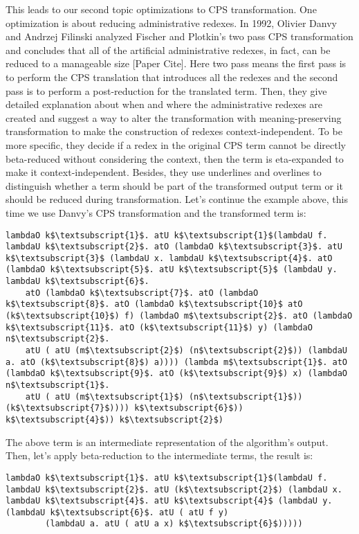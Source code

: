 This leads to our second topic optimizations to CPS transformation. One optimization is about reducing administrative redexes. In 1992, Olivier Danvy and Andrzej Filinski analyzed Fischer and Plotkin's two pass CPS transformation and concludes that all of the artificial administrative redexes, in fact, can be reduced to a manageable size [Paper Cite]. Here two pass means the first pass is to perform the CPS translation that introduces all the redexes and the second pass is to perform a post-reduction for the translated term. Then, they give detailed explanation about when and where the administrative redexes are created and suggest a way to alter the transformation with meaning-preserving transformation to make the construction of redexes context-independent. To be more specific, they decide if a redex in the original CPS term cannot be directly beta-reduced without considering the context, then the term is eta-expanded to make it context-independent. Besides, they use underlines and overlines to distinguish whether a term should be part of the transformed output term or it should be reduced during transformation. Let's continue the example above, this time we use Danvy's CPS transformation and the transformed term is:
\begin{lstlisting}[language=Lambda]
	lambdaO k$\textsubscript{1}$. atU k$\textsubscript{1}$(lambdaU f. lambdaU k$\textsubscript{2}$. atO (lambdaO k$\textsubscript{3}$. atU k$\textsubscript{3}$ (lambdaU x. lambdaU k$\textsubscript{4}$. atO (lambdaO k$\textsubscript{5}$. atU k$\textsubscript{5}$ (lambdaU y. lambdaU k$\textsubscript{6}$. 
	atO (lambdaO k$\textsubscript{7}$. atO (lambdaO k$\textsubscript{8}$. atO (lambdaO k$\textsubscript{10}$ atO (k$\textsubscript{10}$) f) (lambdaO m$\textsubscript{2}$. atO (lambdaO k$\textsubscript{11}$. atO (k$\textsubscript{11}$) y) (lambdaO n$\textsubscript{2}$. 
	atU ( atU (m$\textsubscript{2}$) (n$\textsubscript{2}$)) (lambdaU a. atO (k$\textsubscript{8}$) a)))) (lambda m$\textsubscript{1}$. atO (lambdaO k$\textsubscript{9}$. atO (k$\textsubscript{9}$) x) (lambdaO n$\textsubscript{1}$. 
	atU ( atU (m$\textsubscript{1}$) (n$\textsubscript{1}$)) (k$\textsubscript{7}$)))) k$\textsubscript{6}$)) k$\textsubscript{4}$)) k$\textsubscript{2}$)
\end{lstlisting}

The above term is an intermediate representation of the algorithm's output. Then, let's apply beta-reduction to the intermediate terms, the result is:

\begin{lstlisting}[language=Lambda]
	lambdaO k$\textsubscript{1}$. atU k$\textsubscript{1}$(lambdaU f. lambdaU k$\textsubscript{2}$. atU (k$\textsubscript{2}$) (lambdaU x. lambdaU k$\textsubscript{4}$. atU k$\textsubscript{4}$ (lambdaU y. (lambdaU k$\textsubscript{6}$. atU ( atU f y) 
		(lambdaU a. atU ( atU a x) k$\textsubscript{6}$)))))
\end{lstlisting}

